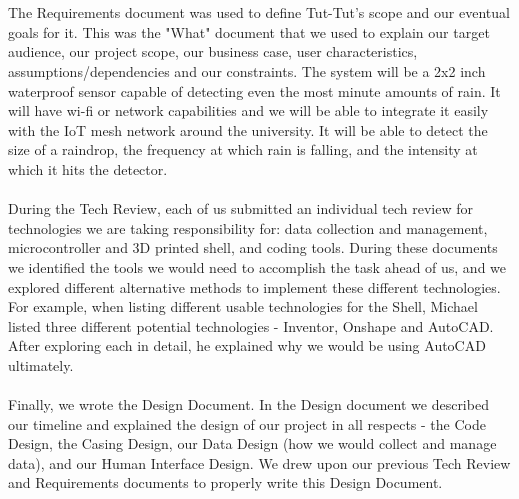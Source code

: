 \documentclass[letterpaper,10pt,draftclsnofoot,onecolumn]{article}
\begin{document}
\\
\\
The Requirements document was used to define Tut-Tut's scope and our eventual goals for it. This was the "What" document that we used to explain our target audience, our project scope, our business case, user characteristics, assumptions/dependencies and our constraints. The system will be a 2x2 inch waterproof sensor capable of detecting even the most minute amounts of rain. It will have wi-fi or network capabilities and we will be able to integrate it easily with the IoT mesh network around the university. It will be able to detect the size of a raindrop, the frequency at which rain is falling, and the intensity at which it hits the detector.
\\
\\
During the Tech Review, each of us submitted an individual tech review for technologies we are taking responsibility for: data collection and management, microcontroller and 3D printed shell, and coding tools. During these documents we identified the tools we would need to accomplish the task ahead of us, and we explored different alternative methods to implement these different technologies. For example, when listing different usable technologies for the Shell, Michael listed three different potential technologies - Inventor, Onshape and AutoCAD. After exploring each in detail, he explained why we would be using AutoCAD ultimately.
\\
\\
Finally, we wrote the Design Document. In the Design document we described our timeline and explained the design of our project in all respects - the Code Design, the Casing Design, our Data Design (how we would collect and manage data), and our Human Interface Design.  We drew upon our previous Tech Review and Requirements documents to properly write this Design Document.
\end{document}
